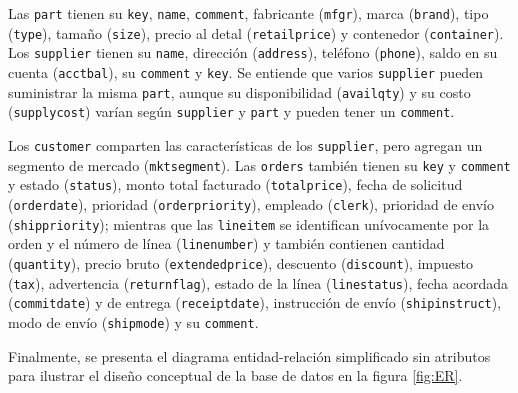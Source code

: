 \documentclass[12pt, letter paper]{report}
\begin{document}
        Las \texttt{part} tienen su \texttt{key}, \texttt{name},
        \texttt{comment}, fabricante (\texttt{mfgr}), marca (\texttt{brand}),
        tipo (\texttt{type}), tamaño (\texttt{size}), precio al detal
        (\texttt{retailprice}) y contenedor (\texttt{container}). Los
        \texttt{supplier} tienen su \texttt{name}, dirección (\texttt{address}),
        teléfono (\texttt{phone}), saldo en su cuenta (\texttt{acctbal}), su
        \texttt{comment} y \texttt{key}. Se entiende que varios
        \texttt{supplier} pueden suministrar la misma \texttt{part}, aunque su
        disponibilidad (\texttt{availqty}) y su costo (\texttt{supplycost})
        varían según \texttt{supplier} y \texttt{part} y pueden tener un
        \texttt{comment}.


        Los \texttt{customer} comparten las características de los
        \texttt{supplier}, pero agregan un segmento de mercado
        (\texttt{mktsegment}). Las \texttt{orders} también tienen su
        \texttt{key} y \texttt{comment} y estado (\texttt{status}), monto total
        facturado (\texttt{totalprice}), fecha de solicitud
        (\texttt{orderdate}), prioridad (\texttt{orderpriority}), empleado
        (\texttt{clerk}), prioridad de envío (\texttt{shippriority}); mientras
        que las \texttt{lineitem} se identifican unívocamente por la orden y el
        número de línea (\texttt{linenumber}) y también contienen cantidad
        (\texttt{quantity}), precio bruto (\texttt{extendedprice}), descuento
        (\texttt{discount}), impuesto (\texttt{tax}), advertencia
        (\texttt{returnflag}), estado de la línea (\texttt{linestatus}), fecha
        acordada (\texttt{commitdate}) y de entrega (\texttt{receiptdate}),
        instrucción de envío (\texttt{shipinstruct}), modo de envío
        (\texttt{shipmode}) y su \texttt{comment}.

        Finalmente, se presenta el diagrama entidad-relación simplificado sin
        atributos para ilustrar el diseño conceptual de la base de datos en la
        figura \ref{fig:ER}.
\end{document}
